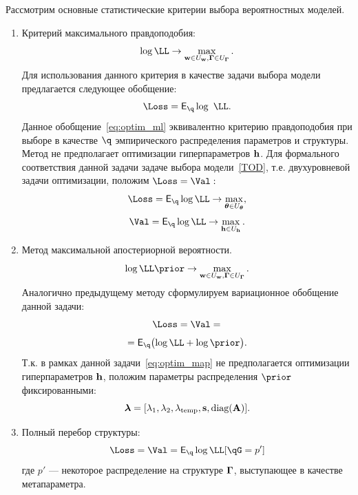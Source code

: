 Рассмотрим основные статистические критерии выбора вероятностных моделей. 
\begin{enumerate}
\item Критерий максимального правдоподобия:
\[\log \LL \to \max_{\w \in \Uw, \G \in \UG}.\]
Для использования данного критерия в качестве задачи выбора модели предлагается следующее обобщение:
\begin{equation}
\label{eq:optim_ml}
    \Loss =  \E_{\q} \log~\LL.
\end{equation}
Данное обобщение~\eqref{eq:optim_ml} эквивалентно  критерию правдоподобия при выборе в качестве $\q$ эмпирического распределения параметров и структуры.
Метод не предполагает оптимизации гиперпараметров $\mathbf{h}$. Для формального соответствия данной задачи задаче выбора модели~\eqref{TOD}, т.е. двухуровневой задачи оптимизации, положим $\Loss=\Val:$
\[
    \Loss =  \E_{\q}\log \LL \to \max_{\teta \in \Uteta},
\]
\[
    \Val =  \E_{\q}\log \LL \to \max_{\h \in \Uh}.
\]



\item Метод максимальной апостериорной вероятности. 
\[\log \LL \prior \to \max_{\w  \in \Uw, \G \in \UG}.\]
Аналогично предыдущему методу сформулируем вариационное обобщение данной задачи:
\begin{equation}
\label{eq:optim_map}
\Loss = \Val = 
\end{equation}
\[
 = \E_{\q} \bigl( \log\LL + \log\prior \bigr).
\]
Т.к. в рамках данной задачи~\eqref{eq:optim_map} не предполагается оптимизации гиперпараметров $\mathbf{h}$, положим параметры распределения $\prior$ фиксированными:
\[
   \boldsymbol{\lambda} = [\lambda_1, \lambda_2, \lambda_{\text{temp}}, \mathbf{s}, \text{diag}(\mathbf{A})].
\]

\item Полный перебор структуры:
\begin{equation}
\label{eq:optim_struct}
    \Loss = \Val = \E_{\q} \log \LL [\qG = p']
\end{equation}
где $p'$ --- некоторое распределение на структуре $\boldsymbol{\Gamma}$, выступающее в качестве метапараметра.





\end{enumerate}
